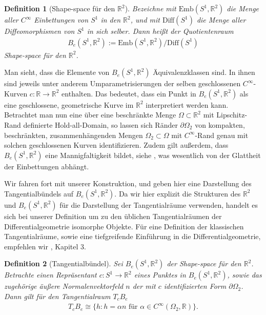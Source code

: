 \documentclass[bibliography=totoc,12pt,a4paper]{scrartcl}
\theoremstyle{exampstyle}
\newtheorem{defi}{Definition}%
\numberwithin{equation}{section}
\begin{document}
\begin{defi}[Shape-space für den $\mathbb{R}^2$]
Bezeichne mit $\text{Emb}(S^1, \mathbb{R}^2)$ die Menge aller $C^\infty$ Einbettungen von $S^1$ in den $\mathbb{R}^2$, und mit $\text{Diff}(S^1)$ die Menge aller Diffeomorphismen von $S^1$ in sich selber. Dann heißt der Quotientenraum
\begin{align*}
	B_e(S^1,\mathbb{R}^2) := \text{Emb}(S^1, \mathbb{R}^2) / \text{Diff}(S^1)
\end{align*}
\textit{Shape-space} für den $\mathbb{R}^2$.
\end{defi}

Man sieht, dass die Elemente von $B_e(S^1,\mathbb{R}^2)$ Äquivalenzklassen sind. In ihnen sind jeweils unter anderem Umparametrisierungen der selben geschlossenen $C^\infty$-Kurven $c: \mathbb{R} \rightarrow \mathbb{R}^2$ enthalten. Das bedeutet, dass ein Punkt in $B_e(S^1,\mathbb{R}^2)$ als eine geschlossene, geometrische Kurve im $\mathbb{R}^2$ interpretiert werden kann. Betrachtet man nun eine über eine beschränkte Menge $\Omega\subset\mathbb{R}^2$ mit Lipschitz-Rand definierte Hold-all-Domain, so lassen sich Ränder $\partial\Omega_2$ von kompakten, beschränkten, zusammenhängenden Mengen $\Omega_2\subset \Omega$ mit $C^\infty$-Rand genau mit solchen geschlossenen Kurven identifizieren. Zudem gilt außerdem, dass $B_e(S^1,\mathbb{R}^2)$ eine Mannigfaltigkeit bildet, siehe \cite{bfgs1}, was wesentlich von der Glattheit der Einbettungen abhängt.

Wir fahren fort mit unserer Konstruktion, und geben hier eine Darstellung des Tangentialbündels auf $B_e(S^1,\mathbb{R}^2)$. Da wir hier explizit die Strukturen des $\mathbb{R}^2$ und $B_e(S^1,\mathbb{R}^2)$ für die Darstellung der Tangentialräume verwenden, handelt es sich bei unserer Definition um zu den üblichen Tangentialräumen der Differentialgeometrie isomorphe Objekte. Für eine Definition der klassischen Tangentialräume, sowie eine tiefgreifende Einführung in die Differentialgeometrie, empfehlen wir \cite{LeeDGEO}, Kapitel 3.

\begin{defi}[Tangentialbündel]\label{Tangentialvektor}
Sei $B_e(S^1, \mathbb{R}^2)$ der Shape-space für den $\mathbb{R}^2$. Betrachte einen Repräsentant $c: S^1 \rightarrow \mathbb{R}^2$ eines Punktes in $B_e(S^1, \mathbb{R}^2)$, sowie das zugehörige äußere Normalenvektorfeld $n$ der mit $c$ identifizierten Form $\partial\Omega_2$. Dann gilt für den \textit{Tangentialraum} $T_cB_e$
\begin{align*}
	T_cB_e \cong \{h : h = \alpha n \text{ für } \alpha \in C^\infty(\Omega_2,\mathbb{R})\}.
\end{align*}

\end{defi}
\end{document}

